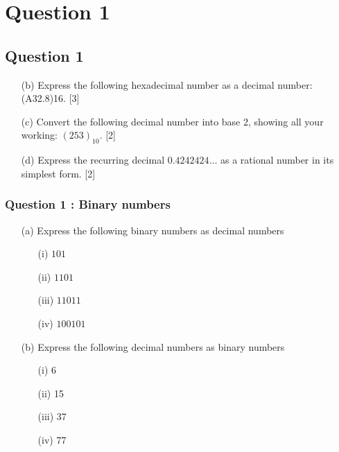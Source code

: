 \documentclass[]{report}
\begin{document}
\section*{Question 1}


\subsection*{Question 1}
\begin{itemize}
\item[(b)] Express the following hexadecimal number as a decimal number: (A32.8)16.
[3]
\item[(c)]  Convert the following decimal number into base 2, showing all your working:
$(253)_{10}$. [2]
\item[(d)]  Express the recurring decimal $0.4242424\ldots$
as a rational number in its simplest
form. [2]
\end{itemize}

\subsubsection*{Question 1 : Binary numbers}
\begin{itemize}
\item[(a)] Express the following binary numbers as decimal numbers
\begin{multicols}{2}
\begin{itemize}
\item[(i)] $101$
\item[(ii)] $1101$
\item[(iii)] $11011$
\item[(iv)] $100101$
\end{itemize}
\end{multicols}

\item[(b)] Express the following decimal numbers as binary numbers
\begin{multicols}{2}
\begin{itemize}
\item[(i)] 6
\item[(ii)] 15
\item[(iii)] 37
\item[(iv)] 77
\end{itemize}
\end{multicols}

\end{itemize}
\end{document}
